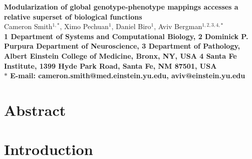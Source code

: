 



\let\ref\autoref

{}
\tableofcontents
\listoffigures
\listoftables
\pagebreak
{}

\begin{flushleft}
{\Large
\textbf{Modularization of global genotype-phenotype mappings accesses a relative superset of biological functions}
}
\\
Cameron Smith$^{1, \ast}$,
Ximo Pechuan$^{1}$,
Daniel Biro$^{1}$,
Aviv Bergman$^{1,2,3,4, \ast}$
\\
\bf{1} Department of Systems and Computational Biology,
\bf{2} Dominick P. Purpura Department of Neuroscience,
\bf{3} Department of Pathology, Albert Einstein College of Medicine, Bronx, NY, USA
\bf{4} Santa Fe Institute, 1399 Hyde Park Road, Santa Fe, NM 87501, USA
\\
$\ast$ E-mail: cameron.smith@med.einstein.yu.edu, aviv@einstein.yu.edu
\end{flushleft}

\section{Abstract}


%

\section{Introduction}


